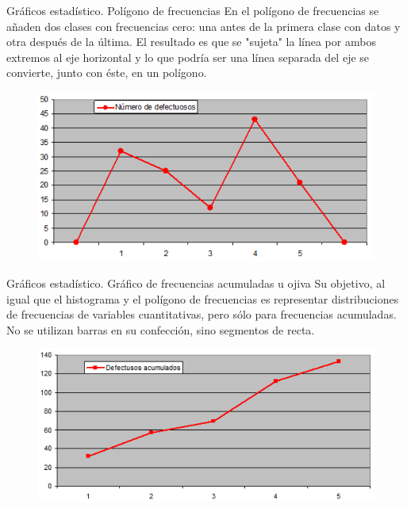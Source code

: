 \documentclass[11pt]{beamer}
\begin{document}
       \begin{frame}{Gráficos estadístico. Polígono de frecuencias}
          En el polígono de frecuencias se añaden dos clases con frecuencias cero: una antes de la primera clase con datos y otra después de la última. El resultado es que se "sujeta" la línea por ambos extremos al eje horizontal y lo que podría ser una línea separada del eje se convierte, junto con éste, en un polígono.
         \begin{figure}
             \centering
             \includegraphics[width=0.6\linewidth]{images/graficos_poligonodef}
             \label{fig:graficospoligonodef}
         \end{figure}

      \end{frame}

      \begin{frame}{Gráficos estadístico. Gráfico de frecuencias acumuladas u ojiva}
          Su objetivo, al igual que el histograma y el polígono de frecuencias es representar distribuciones de frecuencias de variables cuantitativas, pero sólo para frecuencias acumuladas. No se utilizan barras en su confección, sino segmentos de recta.
          \begin{figure}
              \centering
              \includegraphics[width=0.7\linewidth]{images/graficos_ojiva}
              \label{fig:graficosojiva}
          \end{figure}
      \end{frame}
\end{document}
